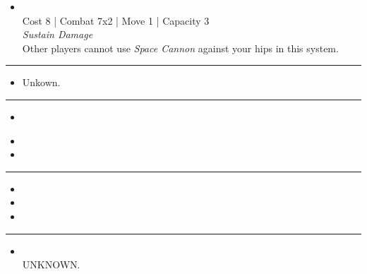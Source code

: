 \begin{multicols}{2}

\begin{itemize}
\item {}\\
Cost 8 | Combat 7x2 | Move 1 | Capacity 3 \\
\emph{Sustain Damage}\\
Other players cannot use \emph{Space Cannon} against your hips in this system.
\end{itemize}

\vspace{-10pt}\rule{\hsize}{0.4pt}\vspace{5pt}


\begin{itemize}
\item Unkown. %
\end{itemize}

\vspace{-10pt}\rule{\hsize}{0.4pt}\vspace{5pt}


\begin{itemize}
\item \strikeWingI
\end{itemize}

\columnbreak
{}

\begin{itemize}
\item \strikeWingII
\item \hololattice
\end{itemize}

\vspace{-10pt}\rule{\hsize}{0.4pt}\vspace{5pt}


\begin{itemize}
\item {}
\item {} 
\item {}
\end{itemize}

\vspace{-10pt}\rule{\hsize}{0.4pt}\vspace{5pt}


\begin{itemize}
\item {}\\
UNKNOWN.
\end{itemize}

\end{multicols}



